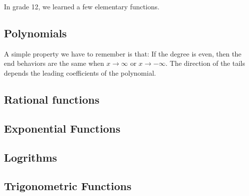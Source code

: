 \documentclass{article}
\begin{document}
In grade 12, we learned a few elementary functions. 
\subsection*{Polynomials}
A simple property we have to remember is that: If the degree is even, then the end behaviors are the same when $x\to\infty$ or $x\to-\infty$. The direction of the tails depends the leading coefficients of the polynomial.   
\subsection*{Rational functions}
\subsection*{Exponential Functions}
\subsection*{Logrithms}
\subsection*{Trigonometric Functions}
\end{document}
